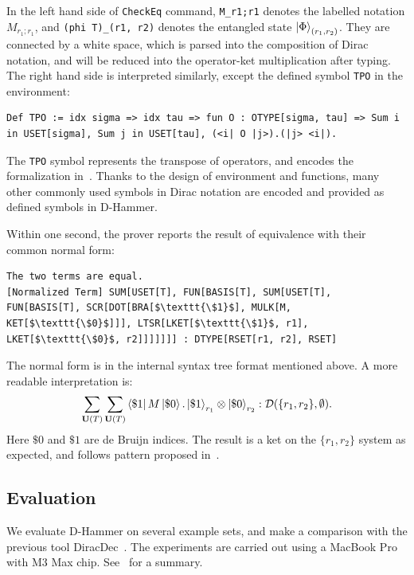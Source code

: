 In the left hand side of \texttt{\textcolor{NavyBlue}{CheckEq}} command, \texttt{M\_r1;r1} denotes the labelled notation $M_{r_1; r_1}$, and \texttt{(phi T)\_(r1, r2)} denotes the entangled state $\ket{\Phi}_{(r_1, r_2)}$. They are connected by a white space, which is parsed into the composition of Dirac notation, and will be reduced into the operator-ket multiplication after typing. The right hand side is interpreted similarly, except the defined symbol \texttt{TPO} in the environment:

\begin{lstlisting}[style=dhammer]
Def TPO := idx sigma => idx tau => fun O : OTYPE[sigma, tau] => Sum i in USET[sigma], Sum j in USET[tau], (<i| O |j>).(|j> <i|).
\end{lstlisting}

The \texttt{TPO} symbol represents the transpose of operators, and encodes the formalization in~. Thanks to the design of environment and functions, many other commonly used symbols in Dirac notation are encoded and provided as defined symbols in D-Hammer.

Within one second, the prover reports the result of equivalence with their common normal form:
    \begin{lstlisting}[style=dhammer]
The two terms are equal.
[Normalized Term] SUM[USET[T], FUN[BASIS[T], SUM[USET[T], FUN[BASIS[T], SCR[DOT[BRA[$\texttt{\$1}$], MULK[M, KET[$\texttt{\$0}$]]], LTSR[LKET[$\texttt{\$1}$, r1], LKET[$\texttt{\$0}$, r2]]]]]]] : DTYPE[RSET[r1, r2], RSET]
    \end{lstlisting}

The normal form is in the internal syntax tree format mentioned above. A more readable interpretation is:
\[
\sum_{\mathbf{U}(T)} \sum_{\mathbf{U}(T)} \bra{\$1}M\ket{\$ 0} . \ket{\$1}_{r_1} \otimes \ket{\$0}_{r_2} : \mathcal{D}(\{r_1, r_2\}, \emptyset).
\]
Here $\$0$ and $\$1$ are de Bruijn indices. The result is a ket on the $\{r_1, r_2\}$ system as expected, and follows pattern proposed in~.



\subsection{Evaluation}
We evaluate D-Hammer on several example sets, and make a comparison with the previous tool DiracDec~\cite{diracdec}.
The experiments are carried out using a MacBook Pro with M3 Max chip. See~ for a summary.


